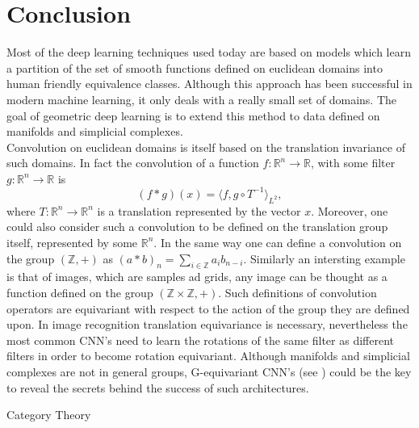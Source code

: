 \documentclass[12pt,a4paper]{report}
\theoremstyle{plain}
\theoremstyle{definition}
\theoremstyle{remark}
\newcommand{\Z}{\mathbb{Z}}
\newcommand{\R}{\mathbb{R}}
\newcommand{\scal}[2]{\langle #1, #2 \rangle}
\begin{document}
   \chapter*{Conclusion}
        Most of the deep learning techniques used today are based on models which learn a partition of the set of smooth functions defined on euclidean 
        domains into human friendly equivalence classes. Although this approach has been successful in modern machine learning, it only deals with a really 
        small set of domains. The goal of geometric deep learning is to extend this method to data defined on manifolds and simplicial complexes.\\
        Convolution on euclidean domains is itself based on the translation invariance of such domains. In fact the convolution of a function $f : \R^n \to \R$,
        with some filter $g:\R^n \to \R$ is \[(f * g)(x) = \scal{f}{g \circ T^{-1}}_{L^2},\] where $T:\R^n \to \R^n$ is a translation represented by the vector $x$.
        Moreover, one could also consider such a convolution to be defined on the translation group itself, represented by some $\R^n$. 
        In the same way one can define a convolution on the group $(\Z,+)$ as $(a * b)_n = \sum_{i \in \Z}a_i b_{n-i}$.
        Similarly an intersting example is that of images, which are samples ad grids, any image can be thought as a function defined on the group $(\Z \times \Z, +)$.
        Such definitions of convolution operators are equivariant with respect to the action of the group they are defined upon.
        In image recognition translation equivariance is necessary, nevertheless the most common CNN's need to learn the rotations of the same filter as different 
        filters in order to become rotation equivariant. Although manifolds and simplicial complexes are not in general groups, G-equivariant CNN's (see \cite{gcnn})
        could be the key to reveal the secrets behind the success of such architectures.
    \begin{appendices}
        \begin{chapter}{Category Theory}
            \label{app:A}
            
        \end{chapter}
    \end{appendices}
    \newpage
    \printbibliography[heading = bibintoc]
\end{document}
